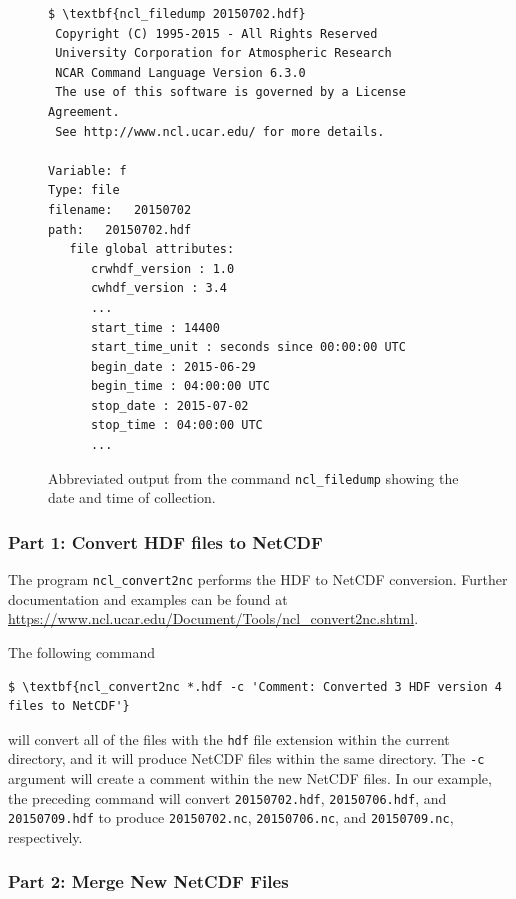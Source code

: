 \documentclass[11pt]{report}
\begin{document}
\begin{figure}[!h]
  \centering
  \begin{minipage}[b]{0.6\linewidth}
\begin{Verbatim}[fontsize=\small,commandchars=\\\{\}]
$ \textbf{ncl_filedump 20150702.hdf}
 Copyright (C) 1995-2015 - All Rights Reserved
 University Corporation for Atmospheric Research
 NCAR Command Language Version 6.3.0
 The use of this software is governed by a License Agreement.
 See http://www.ncl.ucar.edu/ for more details.

Variable: f
Type: file
filename:	20150702
path:	20150702.hdf
   file global attributes:
      crwhdf_version : 1.0
      cwhdf_version : 3.4
      ...
      start_time : 14400
      start_time_unit : seconds since 00:00:00 UTC
      begin_date : 2015-06-29
      begin_time : 04:00:00 UTC
      stop_date : 2015-07-02
      stop_time : 04:00:00 UTC
      ...
\end{Verbatim}
\end{minipage}
  \caption{Abbreviated output from the command \texttt{ncl\_filedump} showing the date and time of collection.}
  \label{fig:filedump}
\end{figure}

\subsubsection{Part 1: Convert HDF files to NetCDF}

The program \texttt{ncl\_convert2nc} performs the HDF to NetCDF conversion.
Further documentation and examples can be found at \url{https://www.ncl.ucar.edu/Document/Tools/ncl_convert2nc.shtml}.

The following command
\begin{Verbatim}[xleftmargin=.5in,commandchars=\\\{\}]
$ \textbf{ncl_convert2nc *.hdf -c 'Comment: Converted 3 HDF version 4 files to NetCDF'}
\end{Verbatim}
will convert all of the files with the \texttt{hdf} file extension within the current directory, and it will produce NetCDF files within the same directory.
The \texttt{-c} argument will create a comment within the new NetCDF files.
In our example, the preceding command will convert \texttt{20150702.hdf}, \texttt{20150706.hdf}, and \texttt{20150709.hdf} to produce \texttt{20150702.nc}, \texttt{20150706.nc}, and \texttt{20150709.nc}, respectively.

\subsubsection{Part 2: Merge New NetCDF Files}
\label{s:conversion:p2}
\end{document}
